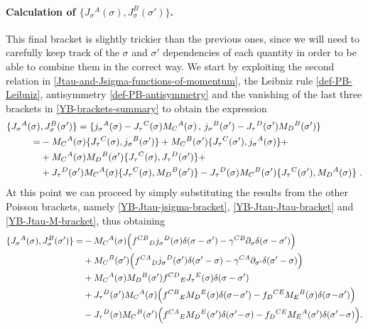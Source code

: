 \documentclass[12pt]{article}
\numberwithin{equation}{section}
\begin{document}
\paragraph{Calculation of $\{ J_{\sigma}{}^{A}(\sigma),J_{\sigma}^{B}(\sigma') \}$.} This final bracket is slightly trickier than the previous ones, since we will need to carefully keep track of the $\sigma$ and $\sigma'$ dependencies of each quantity in order to be able to combine them in the correct way. We start by exploiting the second relation in \eqref{Jtau-and-Jsigma-functions-of-momentum}, the Leibniz rule \eqref{def-PB-Leibniz}, antisymmetry \eqref{def-PB-antisymmetry} and the vanishing of the last three brackets in \eqref{YB-brackets-summary} to obtain the expression
\begin{align}
\{ J_{\sigma}{}^{A}(\sigma)&,J_{\sigma}^{B}(\sigma') \} = \{ j_{\sigma}{}^{A}(\sigma)-J_{\tau}{}^{C}(\sigma)M_{C}{}^{A}(\sigma) \, , \, j_{\sigma}{}^{B}(\sigma')-J_{\tau}{}^{D}(\sigma')M_{D}{}^{B}(\sigma') \}
\\
=& -M_{C}{}^{A}(\sigma)\{J_{\tau}{}^{C}(\sigma),j_{\sigma}{}^{B}(\sigma')\}+M_{C}{}^{B}(\sigma')\{J_{\tau}{}^{C}(\sigma'),j_{\sigma}{}^{A}(\sigma)\}+
\notag\\
&+M_{C}{}^{A}(\sigma)M_{D}{}^{B}(\sigma')\{ J_{\tau}{}^{C}(\sigma),J_{\tau}{}^{D}(\sigma') \}+
\notag\\
&+J_{\tau}{}^{D}(\sigma')M_{C}{}^{A}(\sigma)\{J_{\tau}{}^{C}(\sigma),M_{D}{}^{B}(\sigma')\}-J_{\tau}{}^{D}(\sigma)M_{C}{}^{B}(\sigma')\{J_{\tau}{}^{C}(\sigma'),M_{D}{}^{A}(\sigma)\} \,\, .
\notag
\end{align}
At this point we can proceed by simply substituting the results from the other Poisson brackets, namely \eqref{YB-Jtau-jsigma-bracket}, \eqref{YB-Jtau-Jtau-bracket} and \eqref{YB-Jtau-M-bracket}, thus obtaining
\begin{align}\label{YB-intermediate-step}
\{ J_{\sigma}{}^{A}(\sigma),J_{\sigma}^{B}(\sigma') \} =& -M_{C}{}^{A}(\sigma)\Bigl( f^{CB}{}_{D}j_{\sigma}{}^{D}(\sigma)\delta(\sigma-\sigma')-\gamma^{CB}\partial_{\sigma}\delta(\sigma-\sigma')\Bigr)
\\
& +M_{C}{}^{B}(\sigma')\Bigl( f^{CA}{}_{D}j_{\sigma}{}^{D}(\sigma')\delta(\sigma'-\sigma)-\gamma^{CA}\partial_{\sigma'}\delta(\sigma'-\sigma) \Bigr)
\notag \\
&+ M_{C}{}^{A}(\sigma)M_{D}{}^{B}(\sigma')f^{CD}{}_{E}J_{\tau}{}^{E}(\sigma)\delta(\sigma-\sigma')
\notag \\
&+J_{\tau}{}^{D}(\sigma')M_{C}{}^{A}(\sigma) \Bigl( f^{CB}{}_{E}M_{D}{}^{E}(\sigma)\delta(\sigma\!-\!\sigma')-f_{D}{}^{CE}M_{E}{}^{B}(\sigma)\delta(\sigma\!-\!\sigma') \Bigr)
\notag \\
&-J_{\tau}{}^{D}(\sigma)M_{C}{}^{B}(\sigma') \Bigl( f^{CA}{}_{E}M_{D}{}^{E}(\sigma')\delta(\sigma'\!-\!\sigma)-f_{D}{}^{CE}M_{E}{}^{A}(\sigma')\delta(\sigma'\!-\!\sigma) \Bigr)
\notag  .
\end{align}
\end{document}
